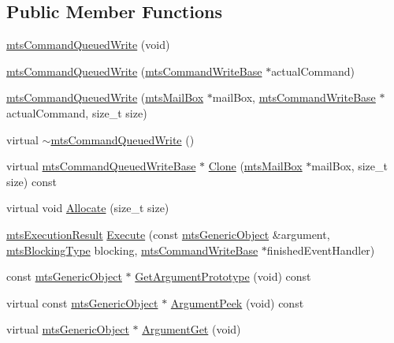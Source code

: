 \subsection*{Public Member Functions}
\begin{DoxyCompactItemize}
\item 
\hyperlink{classmts_command_queued_write_a4858efe1420cb5840040042f1b2ca57a}{mts\+Command\+Queued\+Write} (void)
\item 
\hyperlink{classmts_command_queued_write_a7000aca27b43b4085556e5fbb1fca4f0}{mts\+Command\+Queued\+Write} (\hyperlink{classmts_command_write_base}{mts\+Command\+Write\+Base} $\ast$actual\+Command)
\item 
\hyperlink{classmts_command_queued_write_a380711a5f40d7c15a07cc807c505a3f3}{mts\+Command\+Queued\+Write} (\hyperlink{classmts_mail_box}{mts\+Mail\+Box} $\ast$mail\+Box, \hyperlink{classmts_command_write_base}{mts\+Command\+Write\+Base} $\ast$actual\+Command, size\+\_\+t size)
\item 
virtual \hyperlink{classmts_command_queued_write_a1984fe21945f207e3f7e9e879d16cf67}{$\sim$mts\+Command\+Queued\+Write} ()
\item 
virtual \hyperlink{classmts_command_queued_write_base}{mts\+Command\+Queued\+Write\+Base} $\ast$ \hyperlink{classmts_command_queued_write_a7a083a9a4beb94394cd590c33bc0799a}{Clone} (\hyperlink{classmts_mail_box}{mts\+Mail\+Box} $\ast$mail\+Box, size\+\_\+t size) const 
\item 
virtual void \hyperlink{classmts_command_queued_write_a708715a7f63ed3d31aa8ef57c15d5bcb}{Allocate} (size\+\_\+t size)
\item 
\hyperlink{classmts_execution_result}{mts\+Execution\+Result} \hyperlink{classmts_command_queued_write_aac9bc57a48b9cb773327c1020df0cabf}{Execute} (const \hyperlink{classmts_generic_object}{mts\+Generic\+Object} \&argument, \hyperlink{mts_forward_declarations_8h_ad7426ccb6c883bc780d0ee197dddcbe7}{mts\+Blocking\+Type} blocking, \hyperlink{classmts_command_write_base}{mts\+Command\+Write\+Base} $\ast$finished\+Event\+Handler)
\item 
const \hyperlink{classmts_generic_object}{mts\+Generic\+Object} $\ast$ \hyperlink{classmts_command_queued_write_adf14fc179c04c9532b8f2500550bd37c}{Get\+Argument\+Prototype} (void) const 
\item 
virtual const \hyperlink{classmts_generic_object}{mts\+Generic\+Object} $\ast$ \hyperlink{classmts_command_queued_write_a720c2911ca6dff95951947ee393acb9e}{Argument\+Peek} (void) const 
\item 
virtual \hyperlink{classmts_generic_object}{mts\+Generic\+Object} $\ast$ \hyperlink{classmts_command_queued_write_a6ca68723d7a73d8c2e365a45c9f2518a}{Argument\+Get} (void)
\end{DoxyCompactItemize}
